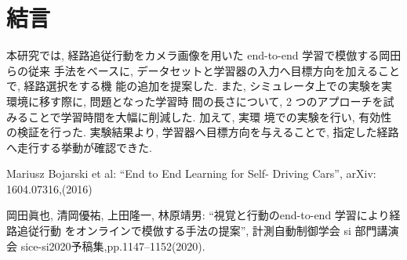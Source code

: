 \documentclass[10pt]{jarticle}
\begin{document}
    \section{結\hspace{2zw}言}%
    
    本研究では, 経路追従行動をカメラ画像を用いた end-to-end 学習で模倣する岡田らの従来
    手法をベースに, データセットと学習器の入力へ目標方向を加えることで, 経路選択をする機
    能の追加を提案した. また, シミュレータ上での実験を実環境に移す際に, 問題となった学習時
    間の長さについて, 2 つのアプローチを試みることで学習時間を大幅に削減した. 加えて, 実環
    境での実験を行い, 有効性の検証を行った. 実験結果より, 学習器へ目標方向を与えることで,
    指定した経路へ走行する挙動が確認できた.
    
    \vspace{5truemm}
    {\footnotesize
        \begin{thebibliography}{99}
            
            Mariusz Bojarski et al: “End to End Learning for Self-
            Driving Cars”, 
            arXiv: 1604.07316,(2016)
            
            岡田眞也, 清岡優祐, 上田隆一, 林原靖男: “視覚と行動のend-to-end 学習により経路追従行動 をオンラインで模倣する手法の提案”, 
            計測自動制御学会 si 部門講演会 sice-si2020予稿集,pp.1147–1152(2020).

        \end{thebibliography}
    }
    \normalsize
    
\end{document}
